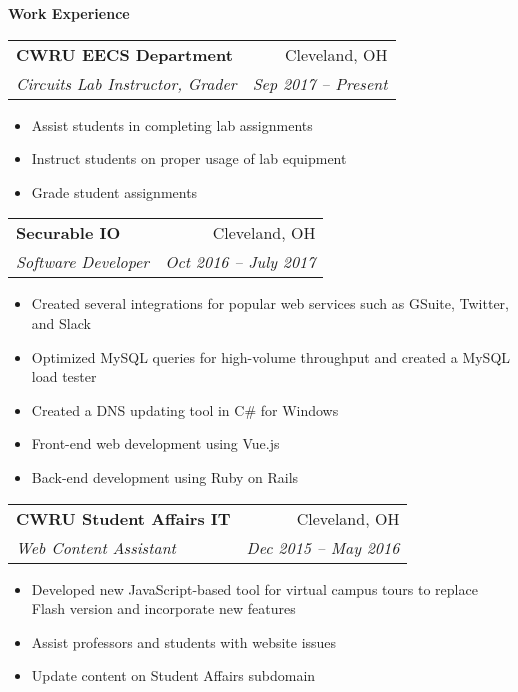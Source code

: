 \documentclass[letterpaper,11pt]{article}
\makeatletter
\newcommand{\resitem}[1]{\item #1}
\newcommand{\resheading}[1]{{\large \colorbox{shadingcolor}{\begin{minipage}{\textwidth}{\textbf{#1 \vphantom{p\^{E}}}}\end{minipage}}}}
\newcommand{\ressubheading}[4]{
\begin{tabular*}{\textwidth}{l@{\extracolsep{\fill}}r}
		\textbf{#1} & #2 \\
		\textit{#3} & \textit{#4} \\
\end{tabular*}\vspace{-6pt}}
\makeatother
\begin{document}
\vspace{0.1in}
%
%
\begin{minipage}{\linewidth}
\vfill\noindent
\begin{minipage}[t]{0.6\linewidth}
	\resheading{Work Experience}
	
	\vspace{0.1in}
	\ressubheading{CWRU EECS Department}{Cleveland, OH}{Circuits Lab Instructor, Grader}{Sep 2017 -- Present}
	\begin{itemize}[leftmargin=*,noitemsep]
		\resitem{Assist students in completing lab assignments}
		\resitem{Instruct students on proper usage of lab equipment}
		\resitem{Grade student assignments}
	\end{itemize}
	
	\ressubheading{Securable IO}{Cleveland, OH}{Software Developer}{Oct 2016 -- July 2017}
	\begin{itemize}[leftmargin=*,noitemsep]
		\resitem{Created several integrations for popular web services such as GSuite, Twitter, and Slack}
		\resitem{Optimized MySQL queries for high-volume throughput and created a MySQL load tester}
		\resitem{Created a DNS updating tool in C\# for Windows}
		\resitem{Front-end web development using Vue.js}
		\resitem{Back-end development using Ruby on Rails}
	\end{itemize}
	
	\ressubheading{CWRU Student Affairs IT}{Cleveland, OH}{Web Content Assistant}{Dec 2015 -- May 2016}
	\begin{itemize}[leftmargin=*,noitemsep]
		\resitem{Developed new JavaScript-based tool for virtual campus tours to replace Flash version and incorporate new features}
		\resitem{Assist professors and students with website issues}
		\resitem{Update content on Student Affairs subdomain}
	\end{itemize}
	

\end{minipage}
\end{minipage}
\end{document}
